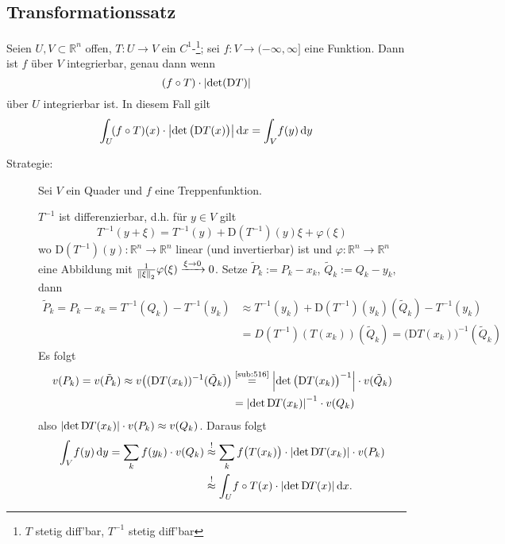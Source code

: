 \subsection{Transformationssatz} %
\label{sub:81}
Seien $U,V \subset \mathds{R}^n$ offen, $T : U \to V$ ein $C^1$-\footnote{$T$ stetig diff'bar, $T ^{-1}$ stetig diff'bar}; sei 
$f : V \to (-\infty, \infty]$ eine Funktion. Dann ist $f$ über $V$ integrierbar, genau dann wenn 
\[
	(f \circ T) \cdot \abs*{\det(\mathrm{D}T)}
\]
über $U$ integrierbar ist. In diesem Fall gilt
\[
	\int_U\! (f \circ T)(x) \cdot \abs*{\det \big(\mathrm{D} T (x)\big)}  \, \mathrm{d}x  = \int_V\! f(y)  \, \mathrm{d}y 
\]
\begin{description}
	\item[Strategie:] Sei $V$ ein Quader und $f$ eine Treppenfunktion. 
	\begin{figure}[h]
	\end{figure} 
	$T ^{-1}$ ist differenzierbar, d.h. für $y \in V$ gilt 
	\[
		T ^{-1} (y+ \xi) = T ^{-1}(y)+ \mathrm{D}(T ^{-1})(y) \xi + \varphi(\xi)
	\]
	wo $\mathrm{D}(T ^{-1})(y) : \mathds{R}^n \to \mathds{R}^n$ linear (und invertierbar) ist und $\varphi: \mathds{R}^n \to \mathds{R}^n$ eine Abbildung mit 
	$\frac{1}{\norm[2]{\xi} } \varphi(\xi) \xrightarrow{\xi \to 0} 0 $. Setze $\tilde P_k := P_k - x_k$, $\tilde Q_k := Q_k - y_k$, dann
	\begin{align*}
		\tilde P_k = P_k - x_k = T ^{-1}(Q_k) - T ^{-1}(y_k) &\approx T ^{-1}(y_k)+ \mathrm{D}(T ^{-1})(y_k)(\tilde Q_k) - T ^{-1}(y_k) \\
		&= D(T ^{-1})(T(x_k))(\tilde Q_k) = \big(\mathrm{D}T(x_k)\big) ^{-1} (\tilde Q_k)
	\end{align*}
	Es folgt
	\begin{align*}
		v(P_k) = v(\tilde P_k) \approx v\big( (\mathrm{D} T(x_k)) ^{-1} (\tilde Q_k)\big) &\stackrel{\text{\ref{sub:516}}}{=} \abs*{\det \big(\mathrm{D}T (x_k)\big) ^{-1}} 
		\cdot v(\tilde Q_k) \\
		&= \abs*{ \det \D T(x_k)} ^{-1} \cdot v(Q_k) 
	\end{align*}
	also $\abs*{\det \D T(x_k)} \cdot v(P_k) \approx v(Q_k) $. Daraus folgt
	\begin{align*}
		\int_V\! f(y)  \, \mathrm{d}y = \sum_{k} f(y_k) \cdot v(Q_k) &\stackrel{!}{\approx} \sum_{k} f\big(T(x_k)\big) \cdot \abs*{\det \D T(x_k)} \cdot v(P_k)   \\
		&\stackrel{!}{\approx} \int_U\! f \circ T(x) \cdot \abs*{\det \D T(x)}  \, \mathrm{d}x.
	\end{align*}
\end{description}

